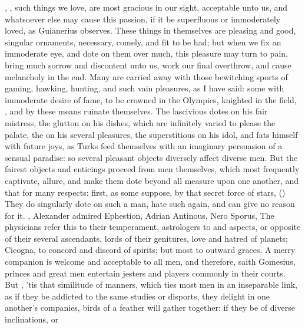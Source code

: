 {, \etc{}, such things we love, are most gracious in our sight,
acceptable unto us, and whatsoever else may cause this passion, if it
be superfluous or immoderately loved, as Guianerius observes. These
things in themselves are pleasing and good, singular ornaments,
necessary, comely, and fit to be had; but when we fix an immoderate
eye, and dote on them over much, this pleasure may turn to pain, bring
much sorrow and discontent unto us, work our final overthrow, and cause
melancholy in the end. Many are carried away with those bewitching
sports of gaming, hawking, hunting, and such vain pleasures, as I
have said: some with immoderate desire of fame, to be crowned in the
Olympics, knighted in the field, \etc{}, and by these means ruinate
themselves. The lascivious dotes on his fair mistress, the glutton on
his dishes, which are infinitely varied to please the palate, the
 on his several pleasures, the superstitious on his idol, and
fats himself with future joys, as Turks feed themselves with an
imaginary persuasion of a sensual paradise: so several pleasant objects
diversely affect diverse men. But the fairest objects and enticings
proceed from men themselves, which most frequently captivate, allure,
and make them dote beyond all measure upon one another, and that for
many respects: first, as some suppose, by that secret force of stars,
() They do singularly dote on such a man,
hate such again, and can give no reason for it. , \etc{} Alexander admired Ephestion, Adrian Antinous, Nero Sporus,
\etc{} The physicians refer this to their temperament, astrologers to
 and  aspects, or opposite of their several ascendants,
lords of their genitures, love and hatred of planets;  Cicogna,
to concord and discord of spirits; but most to outward graces. A merry
companion is welcome and acceptable to all men, and therefore, saith
Gomesius, princes and great men entertain jesters and players
commonly in their courts. But , 'tis that similitude of manners, which ties most
men in an inseparable link, as if they be addicted to the same studies
or disports, they delight in one another's companies, birds of a
feather will gather together: if they be of diverse inclinations, or
}
